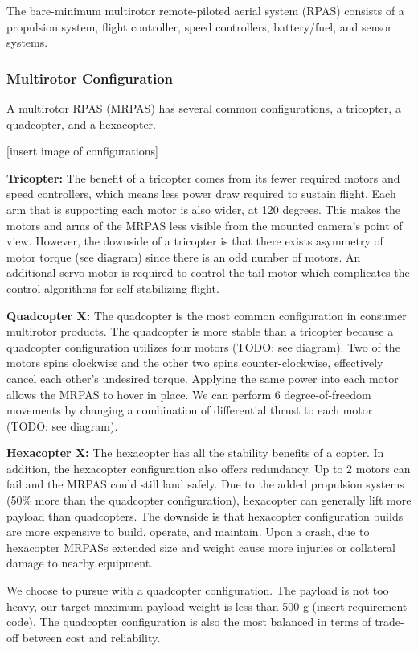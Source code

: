 The bare-minimum multirotor remote-piloted aerial system (RPAS) consists of a propulsion system, flight controller, speed controllers, battery/fuel, and sensor systems.

\subsubsection{Multirotor Configuration}

A multirotor RPAS (MRPAS) has several common configurations, a tricopter, a quadcopter, and a hexacopter.

[insert image of configurations]

\textbf{Tricopter: }The benefit of a tricopter comes from its fewer required motors and speed controllers, 
which means less power draw required to sustain flight. Each arm that is supporting each motor is also wider, at 120 
degrees. This makes the motors and arms of the MRPAS less visible from the mounted camera's point of view. 
However, the downside of a tricopter is that there exists asymmetry of motor torque (see diagram) since 
there is an odd number of motors. An additional servo motor is required to control the tail motor which 
complicates the control algorithms for self-stabilizing flight.

\textbf{Quadcopter X: }
The quadcopter is the most common configuration in consumer multirotor products. The quadcopter is more stable than a tricopter because a quadcopter configuration utilizes four motors (TODO: see diagram). Two of the motors spins  
clockwise and the other two spins counter-clockwise, effectively cancel each other’s undesired torque. 
Applying the same power into each motor allows the MRPAS to hover in place. We can perform 6 degree-of-freedom movements by changing a combination of differential thrust to each motor (TODO: see diagram).

\textbf{Hexacopter X: }
The hexacopter has all the stability benefits of a copter. In addition, the hexacopter configuration also 
offers redundancy. Up to 2 motors can fail and the MRPAS could still land safely. Due to the added 
propulsion systems (50\% more than the quadcopter configuration), hexacopter can generally lift more 
payload than quadcopters. The downside is that hexacopter configuration builds are more expensive to build, 
operate, and maintain. Upon a crash, due to hexacopter MRPASs extended size and weight cause more injuries 
or collateral damage to nearby equipment.

We choose to pursue with a quadcopter configuration. The payload is not too heavy, our target maximum payload weight is less than 500 g (insert requirement code). The quadcopter configuration is also the most balanced in terms of trade-off between cost and reliability. 

